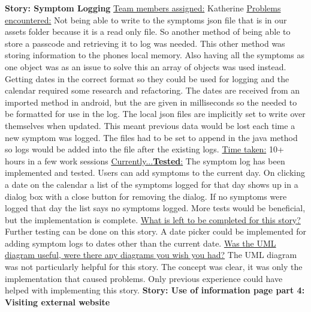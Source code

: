 \documentclass[letterpaper,12pt,titlepage]{article}
\begin{document}
\textbf{Story: Symptom Logging}
\newline
\newline
\underline{Team members assigned:}
Katherine
\newline
\underline{Problems encountered:}
Not being able to write to the symptoms json file that is in our assets folder because it is a read only file. So another method of being able to store a passcode and retrieving it to log was needed. This other method was storing information to the phones local memory.  Also having all the symptoms as one object was as an issue to solve this an array of objects was used instead.
\newline
Getting dates in the correct format so they could be used for logging and the calendar required some research and refactoring. The dates are received from an imported method in android, but the are given in milliseconds so the needed to be formatted for use in the log.
\newline
The local json files are implicitly set to write over themselves when updated. This meant previous data would be lost each time a new symptom was logged. The files had to be set to append in the java method so logs would be added into the file after the existing logs. 
\newline
\underline{Time taken:}
10+ hours in a few work sessions
\newline
\underline{Currently...\textbf{Tested}:}
The symptom log has been implemented and tested. Users can add symptoms to the current day. On clicking a date on the calendar a list of the symptoms logged for that day shows up in a dialog box with a close button for removing the dialog. If no symptoms were logged that day the list says no symptoms logged. More tests would be beneficial, but the implementation is complete. 
\newline
\underline{What is left to be completed for this story?}
Further testing can be done on this story. A date picker could be implemented for adding symptom logs to dates other than the current date. 
\newline
\underline{Was the UML diagram useful, were there any diagrams you wish you had?}
The UML diagram was not particularly helpful for this story. The concept was clear, it was only the implementation that caused problems. Only previous experience could have helped with implementing this story.
\newline
\newline
\newpage
\noindent
\textbf{Story: Use of information page part 4: Visiting external website}
\end{document}
